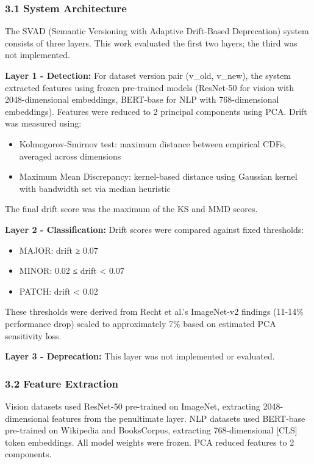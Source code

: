 
\subsubsection{3.1 System Architecture}

The SVAD (Semantic Versioning with Adaptive Drift-Based Deprecation) system consists of three layers. This work evaluated the first two layers; the third was not implemented.

\textbf{Layer 1 - Detection:} For dataset version pair (v_old, v_new), the system extracted features using frozen pre-trained models (ResNet-50 for vision with 2048-dimensional embeddings, BERT-base for NLP with 768-dimensional embeddings). Features were reduced to 2 principal components using PCA. Drift was measured using:

\begin{itemize}
\item Kolmogorov-Smirnov test: maximum distance between empirical CDFs, averaged across dimensions
\item Maximum Mean Discrepancy: kernel-based distance using Gaussian kernel with bandwidth set via median heuristic
\end{itemize}

The final drift score was the maximum of the KS and MMD scores.

\textbf{Layer 2 - Classification:} Drift scores were compared against fixed thresholds:
\begin{itemize}
\item MAJOR: drift ≥ 0.07
\item MINOR: 0.02 ≤ drift < 0.07
\item PATCH: drift < 0.02
\end{itemize}

These thresholds were derived from Recht et al.'s ImageNet-v2 findings (11-14\% performance drop) scaled to approximately 7\% based on estimated PCA sensitivity loss.

\textbf{Layer 3 - Deprecation:} This layer was not implemented or evaluated.

\subsubsection{3.2 Feature Extraction}

Vision datasets used ResNet-50 \citep{Heetal2016} pre-trained on ImageNet, extracting 2048-dimensional features from the penultimate layer. NLP datasets used BERT-base \citep{Devlinetal2019} pre-trained on Wikipedia and BooksCorpus, extracting 768-dimensional [CLS] token embeddings. All model weights were frozen. PCA reduced features to 2 components.

